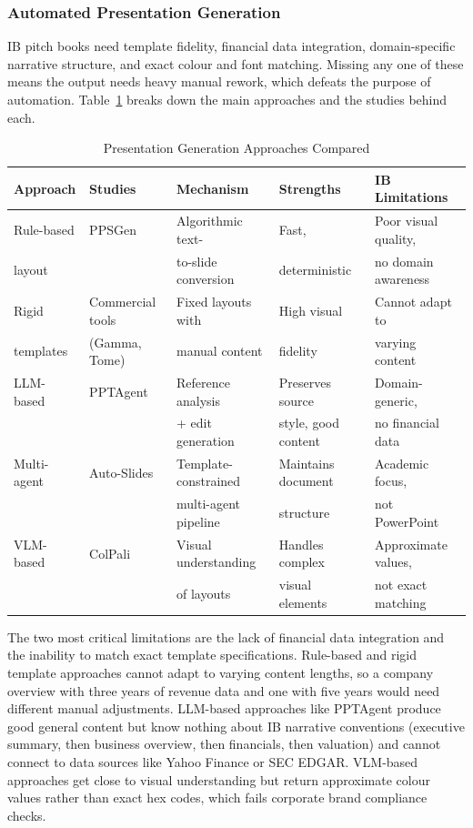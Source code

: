 \subsubsection{Automated Presentation Generation}

IB pitch books need template fidelity, financial data integration, domain-specific narrative structure, and exact colour and font matching. Missing any one of these means the output needs heavy manual rework, which defeats the purpose of automation. Table~\ref{tab:pres-taxonomy} breaks down the main approaches and the studies behind each.

\begin{table}[H]
\centering
\small
\begin{tabular}{|l|l|l|l|l|}
\hline
\rowcolor{gray!20} \textbf{Approach} & \textbf{Studies} & \textbf{Mechanism} & \textbf{Strengths} & \textbf{IB Limitations} \\
\hline
Rule-based & PPSGen & Algorithmic text- & Fast, & Poor visual quality, \\
layout & \parencite{hu2013} & to-slide conversion & deterministic & no domain awareness \\
\hline
Rigid & Commercial tools & Fixed layouts with & High visual & Cannot adapt to \\
templates & (Gamma, Tome) & manual content & fidelity & varying content \\
\hline
LLM-based & PPTAgent & Reference analysis & Preserves source & Domain-generic, \\
 & \parencite{zheng2025} & + edit generation & style, good content & no financial data \\
\hline
Multi-agent & Auto-Slides & Template-constrained & Maintains document & Academic focus, \\
 & \parencite{yang2025} & multi-agent pipeline & structure & not PowerPoint \\
\hline
VLM-based & ColPali & Visual understanding & Handles complex & Approximate values, \\
 & \parencite{faysse2024} & of layouts & visual elements & not exact matching \\
\hline
\end{tabular}
\caption{Presentation Generation Approaches Compared}
\label{tab:pres-taxonomy}
\end{table}

The two most critical limitations are the lack of financial data integration and the inability to match exact template specifications. Rule-based and rigid template approaches cannot adapt to varying content lengths, so a company overview with three years of revenue data and one with five years would need different manual adjustments. LLM-based approaches like PPTAgent produce good general content but know nothing about IB narrative conventions (executive summary, then business overview, then financials, then valuation) and cannot connect to data sources like Yahoo Finance or SEC EDGAR. VLM-based approaches get close to visual understanding but return approximate colour values rather than exact hex codes, which fails corporate brand compliance checks.

